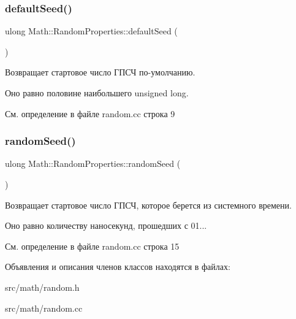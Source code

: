 \subsubsection{\texorpdfstring{default\+Seed()}{defaultSeed()}}
{\footnotesize\ttfamily ulong Math\+::\+Random\+Properties\+::default\+Seed (\begin{DoxyParamCaption}{ }\end{DoxyParamCaption})\hspace{0.3cm}{\ttfamily [static]}}



Возвращает стартовое число ГПСЧ по-\/умолчанию. 

Оно равно половине наибольшего unsigned long. 

См. определение в файле random.\+cc строка 9

\hypertarget{class_math_1_1_random_properties_a94bd24abcba2d281ea50dce34a0a9ac4}{}\label{class_math_1_1_random_properties_a94bd24abcba2d281ea50dce34a0a9ac4} 
\subsubsection{\texorpdfstring{random\+Seed()}{randomSeed()}}
{\footnotesize\ttfamily ulong Math\+::\+Random\+Properties\+::random\+Seed (\begin{DoxyParamCaption}{ }\end{DoxyParamCaption})\hspace{0.3cm}{\ttfamily [static]}}



Возвращает стартовое число ГПСЧ, которое берется из системного времени. 

Оно равно количеству наносекунд, прошедших с 01... 

См. определение в файле random.\+cc строка 15



Объявления и описания членов классов находятся в файлах\+:\begin{DoxyCompactItemize}
\item 
src/math/random.\+h\item 
src/math/random.\+cc\end{DoxyCompactItemize}
